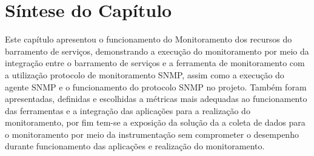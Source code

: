 
\section{Síntese do Capítulo}
\label{sintese4}

Este capítulo apresentou o funcionamento do Monitoramento dos recursos do barramento de serviços, demonstrando a execução do monitoramento por meio da integração entre o barramento de serviços e a ferramenta de monitoramento com a utilização protocolo de monitoramento \acrshort{SNMP}, assim como a execução do agente \acrshort{SNMP} e o funcionamento do protocolo \acrshort{SNMP} no projeto. Também foram apresentadas, definidas e escolhidas a métricas mais adequadas ao funcionamento das ferramentas e a integração das aplicações para a realização do monitoramento, por fim tem-se a exposição da solução da a coleta de dados para o monitoramento por meio da instrumentação sem comprometer o desempenho durante funcionamento das aplicações e realização do monitoramento. 